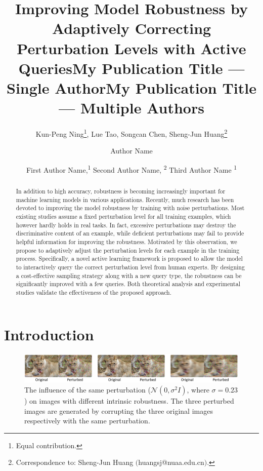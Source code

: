 \documentclass[letterpaper]{article} %
\title{Improving Model Robustness by Adaptively Correcting \\Perturbation Levels with Active Queries}
\author{
Kun-Peng Ning\thanks{Equal contribution.},
Lue Tao\footnotemark[1],
Songcan Chen,
Sheng-Jun Huang\thanks{Correspondence to: Sheng-Jun Huang $($huangsj@nuaa.edu.cn$)$.}\\
}
\title{My Publication Title --- Single Author}
\author {
Author Name \\
}
\title{My Publication Title --- Multiple Authors}
\author {
First Author Name,\textsuperscript{\rm 1}
Second Author Name, \textsuperscript{\rm 2}
Third Author Name \textsuperscript{\rm 1} \\
}
\begin{document}
\maketitle


\begin{abstract}
In addition to high accuracy, robustness is becoming increasingly important for machine learning models in various applications. Recently, much research has been devoted to improving the model robustness by training with noise perturbations. Most existing studies assume a fixed perturbation level for all training examples, which however hardly holds in real tasks. In fact, excessive perturbations may destroy the discriminative content of an example, while deficient perturbations may fail to provide helpful information for improving the robustness. Motivated by this observation, we propose to adaptively adjust the perturbation levels for each example in the training process. Specifically, a novel active learning framework is proposed to allow the model to interactively query the correct perturbation level from human experts. By designing a cost-effective sampling strategy along with a new query type, the robustness can be significantly improved with a few queries. Both theoretical analysis and experimental studies validate the effectiveness of the proposed approach.
\end{abstract}


\section{Introduction}

\begin{figure}[t]
\begin{center}
\includegraphics*[width=0.995\textwidth]{img/diffnoise3.pdf}
\caption{The influence of the same perturbation ($\mathcal{N}(0, \sigma^2 I)$, where $\sigma=0.23$) on images with different intrinsic robustness. The three perturbed images are generated by corrupting the three original images respectively with the same perturbation.}
\label{fig:example}
\end{center}
\end{figure}
\end{document}
